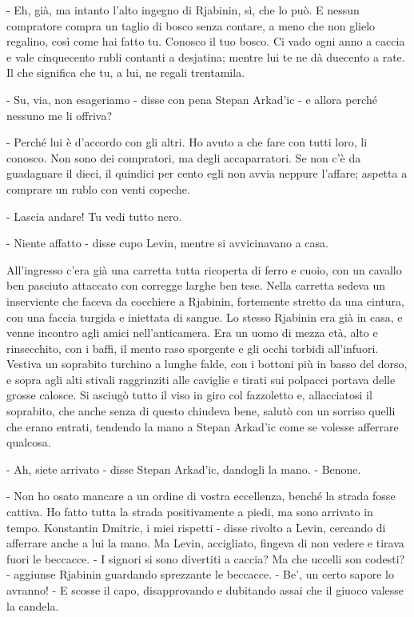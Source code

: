 - Eh, già, ma intanto l'alto ingegno di Rjabinin, sì, che lo può. E nessun compratore compra un taglio di bosco senza contare, a meno che non glielo regalino, così come hai fatto tu. Conosco il tuo bosco. Ci vado ogni anno a caccia e vale cinquecento rubli contanti a desjatina; mentre lui te ne dà duecento a rate. Il che significa che tu, a lui, ne regali trentamila. 

- Su, via, non esageriamo - disse con pena Stepan Arkad'ic - e allora perché nessuno me li offriva? 

- Perché lui è d'accordo con gli altri. Ho avuto a che fare con tutti loro, li conosco. Non sono dei compratori, ma degli accaparratori. Se non c'è da guadagnare il dieci, il quindici per cento egli non avvia neppure l'affare; aspetta a comprare un rublo con venti copeche. 

- Lascia andare! Tu vedi tutto nero. 

- Niente affatto - disse cupo Levin, mentre si avvicinavano a casa. 

All'ingresso c'era già una carretta tutta ricoperta di ferro e cuoio, con un cavallo ben pasciuto attaccato con corregge larghe ben tese. Nella carretta sedeva un inserviente che faceva da cocchiere a Rjabinin, fortemente stretto da una cintura, con una faccia turgida e iniettata di sangue. Lo stesso Rjabinin era già in casa, e venne incontro agli amici nell'anticamera. Era un uomo di mezza età, alto e rinsecchito, con i baffi, il mento raso sporgente e gli occhi torbidi all'infuori. Vestiva un soprabito turchino a lunghe falde, con i bottoni più in basso del dorso, e sopra agli alti stivali raggrinziti alle caviglie e tirati sui polpacci portava delle grosse calosce. Si asciugò tutto il viso in giro col fazzoletto e, allacciatosi il soprabito, che anche senza di questo chiudeva bene, salutò con un sorriso quelli che erano entrati, tendendo la mano a Stepan Arkad'ic come se volesse afferrare qualcosa. 

- Ah, siete arrivato - disse Stepan Arkad'ic, dandogli la mano. - Benone. 

- Non ho osato mancare a un ordine di vostra eccellenza, benché la strada fosse cattiva. Ho fatto tutta la strada positivamente a piedi, ma sono arrivato in tempo. Konstantin Dmitric, i miei rispetti - disse rivolto a Levin, cercando di afferrare anche a lui la mano. Ma Levin, accigliato, fingeva di non vedere e tirava fuori le beccacce. - I signori si sono divertiti a caccia? Ma che uccelli son codesti? - aggiunse Rjabinin guardando sprezzante le beccacce. - Be', un certo sapore lo avranno! - E scosse il capo, disapprovando e dubitando assai che il giuoco valesse la candela. 


